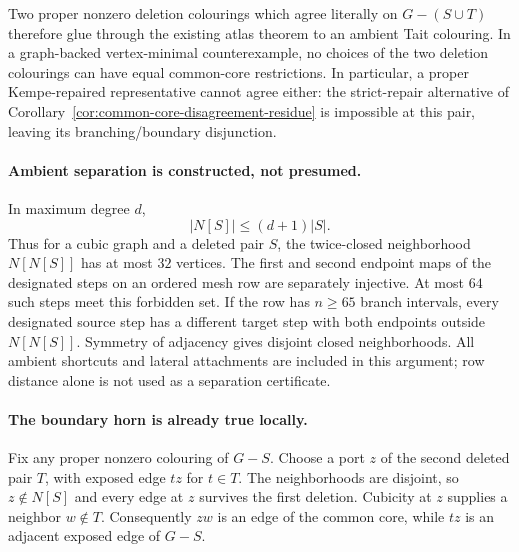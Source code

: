 Two proper nonzero deletion colourings which agree literally on
$G-(S\cup T)$ therefore glue through the existing atlas theorem to an
ambient Tait colouring. In a graph-backed vertex-minimal counterexample,
no choices of the two deletion colourings can have equal common-core
restrictions. In particular, a proper Kempe-repaired representative cannot
agree either: the strict-repair alternative of
Corollary~\ref{cor:common-core-disagreement-residue} is impossible at this
pair, leaving its branching/boundary disjunction.

\paragraph{Ambient separation is constructed, not presumed.}
In maximum degree $d$,
\[
                  |N[S]|\leq(d+1)|S|.
\]
Thus for a cubic graph and a deleted pair $S$, the twice-closed
neighborhood $N[N[S]]$ has at most $32$ vertices. The first and second
endpoint maps of the designated steps on an ordered mesh row are
separately injective. At most $64$ such steps meet this forbidden set.
If the row has $n\geq65$ branch intervals, every designated source step
has a different target step with both endpoints outside $N[N[S]]$.
Symmetry of adjacency gives disjoint closed neighborhoods. All ambient
shortcuts and lateral attachments are included in this argument; row
distance alone is not used as a separation certificate.

\paragraph{The boundary horn is already true locally.}
Fix any proper nonzero colouring of $G-S$. Choose a port $z$ of the
second deleted pair $T$, with exposed edge $tz$ for $t\in T$.
The neighborhoods are disjoint, so $z\notin N[S]$ and every edge at $z$
survives the first deletion. Cubicity at $z$ supplies a neighbor
$w\notin T$. Consequently $zw$ is an edge of the common core, while
$tz$ is an adjacent exposed edge of $G-S$.

